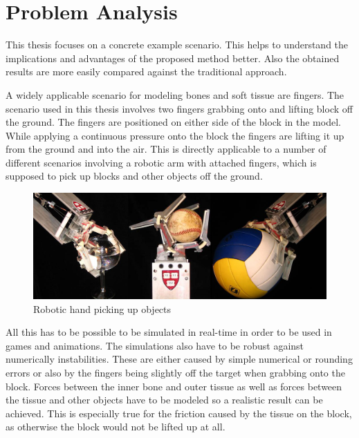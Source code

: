 \chapter{Problem Analysis}
\label{cha:problem_analysis}

This thesis focuses on a concrete example scenario. This helps to understand the implications and advantages of the proposed method better. Also the obtained results are more easily compared against the traditional approach.

A widely applicable scenario for modeling bones and soft tissue are fingers. The scenario used in this thesis involves two fingers grabbing onto and lifting block off the ground. The fingers are positioned on either side of the block in the model. While applying a continuous pressure onto the block the fingers are lifting it up from the ground and into the air. This is directly applicable to a number of different scenarios involving a robotic arm with attached fingers, which is supposed to pick up blocks and other objects off the ground.

\begin{figure}[htb]
\centering
\includegraphics[width=.96\textwidth]{images/robot_grabbing.png}
\caption[Robotic hand picking up objects]{Robotic hand picking up objects\protect\footnotemark}
\label{img:robot_grabbing}
\end{figure}

All this has to be possible to be simulated in real-time in order to be used in games and animations. The simulations also have to be robust against numerically instabilities. These are either caused by simple numerical or rounding errors or also by the fingers being slightly off the target when grabbing onto the block. Forces between the inner bone and outer tissue as well as forces between the tissue and other objects have to be modeled so a realistic result can be achieved. This is especially true for the friction caused by the tissue on the block, as otherwise the block would not be lifted up at all.

